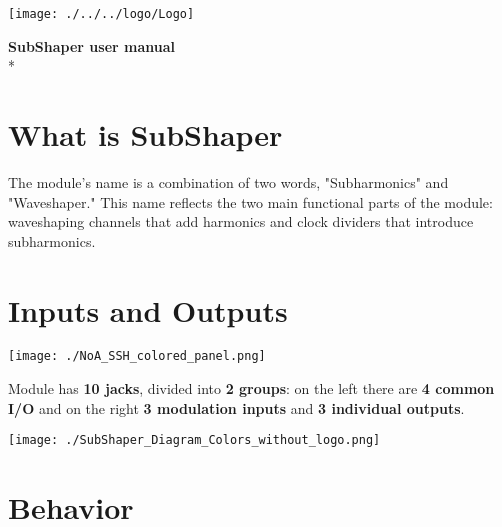 \documentclass[a4paper,14pt]{extarticle}
\begin{document}
\begin{flushright}
\texttt{[image: ./../../logo/Logo]}
\end{flushright}
{\huge\textbf{SubShaper user manual}}\\*
\section*{What is SubShaper}
The module's name is a combination of two words, "Subharmonics" and "Waveshaper." This name reflects the two main functional parts of the module: waveshaping channels that add harmonics and clock dividers that introduce subharmonics.
\section*{Inputs and Outputs}

\begin{center}
\texttt{[image: ./NoA\_SSH\_colored\_panel.png]}
\end{center}
Module has \textbf{10 jacks}, divided into \textbf{2 groups}: on the left there are \textbf{4 common I/O} and on the right \textbf{3 modulation inputs} and \textbf{3 individual outputs}.

\begin{center}
\texttt{[image: ./SubShaper\_Diagram\_Colors\_without\_logo.png]}
\end{center}

\section*{Behavior}
\end{document}
